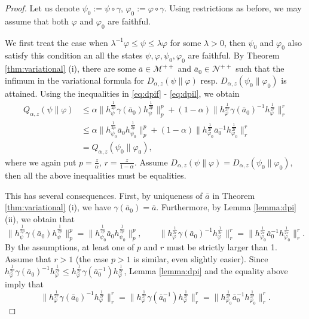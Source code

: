 \documentclass[12pt]{article}
\theoremstyle{definition}
\theoremstyle{remark}
\def\Me{\mathcal M}
\def\Ne{\mathcal N}
\begin{document}
\begin{proof} Let us denote $\psi_0:=\psi\circ\gamma$, $\varphi_0:=\varphi\circ\gamma$.
Using restrictions as before, we may assume that both $\varphi$ and $\varphi_0$ are
faithful.

We first treat the case when  $\lambda^{-1}\varphi\le \psi\le \lambda\varphi$ for
some $\lambda>0$, then
$\psi_0$ and $\varphi_0$ also satisfy this condition an all the states
$\psi,\varphi,\psi_0,\varphi_0$ are faithful. By Theorem \ref{thm:variational}
(i), there are  some $\bar a\in \Me^{++}$ and  $\bar a_0\in \Ne^{++}$ such that the
infimum in the variational formula for $D_{\alpha,z}(\psi\|\varphi)$ resp.
$D_{\alpha,z}(\psi_0\|\varphi_0)$ is attained. Using the inequalities in \eqref{eq:dpif} -
\eqref{eq:dpil}, we obtain
\begin{align*}
Q_{\alpha,z}(\psi\|\varphi)&\le \alpha\|h_\psi^{\frac{1}{2p}}\gamma(\bar a_0)h_\psi^{\frac{1}{2p}}\|_p^p+
(1-\alpha)\|h_\varphi^{\frac{1}{2r}}\gamma(\bar a_0)^{-1}h_\varphi^{\frac{1}{2r}}\|_r^r\\
&\le \alpha\|h_{\psi_0}^{\frac{1}{2p}}\bar a_0h_{\psi_0}^{\frac{1}{2p}}\|_p^p+
(1-\alpha)\|h_{\varphi_0}^{\frac{1}{2r}}\bar
a_0^{-1}h_{\varphi_0}^{\frac{1}{2r}}\|_r^r\\
&= Q_{\alpha,z}(\psi_0\|\varphi_0),
\end{align*}
where we again put $p=\frac{z}{\alpha}$, $r=\frac{z}{1-\alpha}$. Assume
$D_{\alpha,z}(\psi\|\varphi)=D_{\alpha,z}(\psi_0\|\varphi_0)$, then all the above
inequalities must be equalities. 

This has several consequences. First, by uniqueness of $\bar a$ in Theorem
\ref{thm:variational} (i), we have $\gamma(\bar a_0)=\bar a$. Furthermore, by Lemma
\ref{lemma:dpi} (ii), we obtain that 
\[
\|h_\psi^{\frac{1}{2p}}\gamma(\bar
a_0)h_\psi^{\frac{1}{2p}}\|_p^p=\|h_{\psi_0}^{\frac{1}{2p}}\bar
a_0h_{\psi_0}^{\frac{1}{2p}}\|_p^p,\qquad \|h_\varphi^{\frac{1}{2r}}\gamma(\bar
a_0)^{-1}h_\varphi^{\frac{1}{2r}}\|_r^r=\|h_{\varphi_0}^{\frac{1}{2r}}\bar
a_0^{-1}h_{\varphi_0}^{\frac{1}{2r}}\|_r^r.
\]
By the assumptions, at least one of $p$ and $r$ must be strictly larger than 1. Assume
that $r>1$ (the case $p>1$ is similar, even slightly easier). 
Since $h_\varphi^{\frac{1}{2r}}\gamma(\bar a_0)^{-1}h_\varphi^{\frac{1}{2r}} \le
h_\varphi^{\frac{1}{2r}}\gamma(\bar a_0^{-1})h_\varphi^{\frac{1}{2r}}$, Lemma
\ref{lemma:dpi} and the equality above imply that
\begin{equation}\label{eq:norms}
\|h_\varphi^{\frac{1}{2r}}\gamma(\bar a_0)^{-1}h_\varphi^{\frac{1}{2r}}\|_r^r =
\|h_\varphi^{\frac{1}{2r}}\gamma(\bar a_0^{-1})h_\varphi^{\frac{1}{2r}}\|_r^r=\|h_{\varphi_0}^{\frac{1}{2r}}\bar
a_0^{-1}h_{\varphi_0}^{\frac{1}{2r}}\|_r^r.
\end{equation}


\end{proof}
\end{document}

